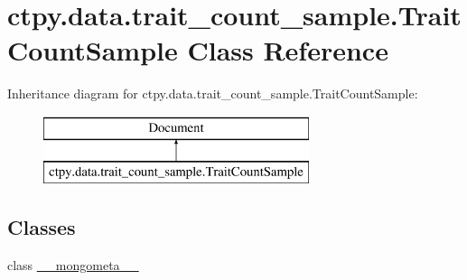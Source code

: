 \hypertarget{classctpy_1_1data_1_1trait__count__sample_1_1_trait_count_sample}{\section{ctpy.\-data.\-trait\-\_\-count\-\_\-sample.\-Trait\-Count\-Sample Class Reference}
\label{classctpy_1_1data_1_1trait__count__sample_1_1_trait_count_sample}
}
Inheritance diagram for ctpy.\-data.\-trait\-\_\-count\-\_\-sample.\-Trait\-Count\-Sample\-:\begin{figure}[H]
\begin{center}
\leavevmode
\includegraphics[height=2.000000cm]{classctpy_1_1data_1_1trait__count__sample_1_1_trait_count_sample}
\end{center}
\end{figure}
\subsection*{Classes}
\begin{DoxyCompactItemize}
\item 
class \hyperlink{classctpy_1_1data_1_1trait__count__sample_1_1_trait_count_sample_1_1____mongometa____}{\-\_\-\-\_\-mongometa\-\_\-\-\_\-}
\end{DoxyCompactItemize}
